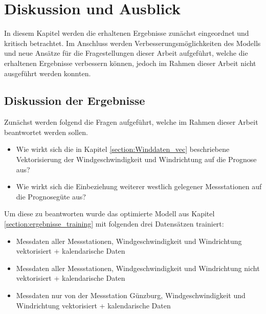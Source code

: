 \documentclass[
12pt, %
toc=listofnumbered, %
toc=chapterentrydotfill, %
numbers=noenddot, %
captions=tableheading, %
bibliography=numbered
]{scrreprt}
\let\Oldsection\section
\renewcommand{\section}{\FloatBarrier\Oldsection}
\begin{document}

\chapter{Diskussion und Ausblick}

In diesem Kapitel werden die erhaltenen Ergebnisse zunächst eingeordnet und kritisch betrachtet.
Im Anschluss werden Verbesserungsmöglichkeiten des Modells und neue Ansätze für die Fragestellungen dieser Arbeit aufgeführt, welche die erhaltenen Ergebnisse verbessern können, jedoch im Rahmen dieser Arbeit nicht ausgeführt werden konnten.

\section{Diskussion der Ergebnisse}\label{section:diskussion_ergebnisse}
Zunächst werden folgend die Fragen aufgeführt, welche im Rahmen dieser Arbeit beantwortet werden sollen.


\begin{itemize}
	\item Wie wirkt sich die in Kapitel \ref{section:Winddaten_vec} beschriebene Vektorisierung der Windgeschwindigkeit und Windrichtung auf die Prognose aus?
	\item Wie wirkt sich die Einbeziehung weiterer westlich gelegener Messstationen auf die Prognosegüte aus?
\end{itemize}

Um diese zu beantworten wurde das optimierte Modell aus Kapitel \ref{section:ergebnisse_training} mit folgenden drei Datensätzen trainiert:

\begin{itemize}
	\item Messdaten aller Messstationen, Windgeschwindigkeit und Windrichtung vektorisiert + kalendarische Daten
	\item Messdaten aller Messstationen, Windgeschwindigkeit und Windrichtung nicht vektorisiert + kalendarische Daten
	\item Messdaten nur von der Messstation Günzburg, Windgeschwindigkeit und Windrichtung vektorisiert + kalendarische Daten
\end{itemize}
\end{document}
